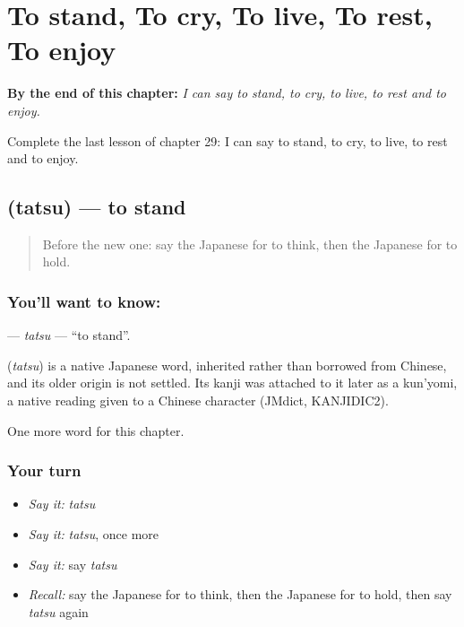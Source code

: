 
\chapter{To stand, To cry, To live, To rest, To enjoy}
\label{ch:ja-to-stand-to-cry-to-live-to-rest-to-enjoy}

\begin{chapteropening}
\textbf{By the end of this chapter:} \emph{I can say to stand, to cry, to live, to rest and to enjoy.}

Complete the last lesson of chapter 29: I can say to stand, to cry, to live, to rest and to enjoy.
\end{chapteropening}

\section[\texorpdfstring{\ja{たつ} (tatsu)}{たつ (tatsu)}]{ (tatsu) — to stand}

\label{lesson:JA-C29-tatsu}



\begin{quote}
Before the new one: say the Japanese for to think, then the Japanese for to hold.
\end{quote}

\subsection*{You'll want to know: }
\textbf{} — \emph{tatsu} — \textquotedblleft{}to stand\textquotedblright{}.

\begin{cousinweb}
\textbf{} (\emph{tatsu}) is a native Japanese word, inherited rather than borrowed from Chinese, and its older origin is not settled. Its kanji was attached to it later as a kun'yomi, a native reading given to a Chinese character (JMdict, KANJIDIC2).
\end{cousinweb}

\begin{grammarlens}[title={What you've built}]
One more word for this chapter.
\end{grammarlens}

\subsection*{Your turn}
\begin{itemize}
\raggedright
  \item \emph{Say it:} \emph{tatsu}
  \item \emph{Say it:} \emph{tatsu}, once more
  \item \emph{Say it:} say \emph{tatsu}
  \item \emph{Recall:} say the Japanese for to think, then the Japanese for to hold, then say \emph{tatsu} again
\end{itemize}

